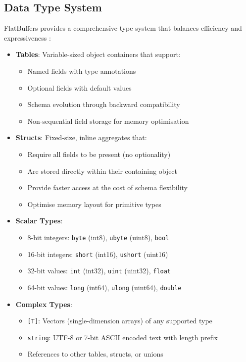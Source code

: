 \subsection{Data Type System}
\label{tb:flatbuffers:data_type_system}

FlatBuffers provides a comprehensive type system that balances efficiency and expressiveness \citep{flatbuffers_data_types}:

\begin{itemize}
  \item \textbf{Tables}: Variable-sized object containers that support:
    \begin{itemize}
      \item Named fields with type annotations
      \item Optional fields with default values
      \item Schema evolution through backward compatibility
      \item Non-sequential field storage for memory optimisation
    \end{itemize}

  \item \textbf{Structs}: Fixed-size, inline aggregates that:
    \begin{itemize}
      \item Require all fields to be present (no optionality)
      \item Are stored directly within their containing object
      \item Provide faster access at the cost of schema flexibility
      \item Optimise memory layout for primitive types
    \end{itemize}

  \item \textbf{Scalar Types}:
    \begin{itemize}
      \item 8-bit integers: \texttt{byte} (int8), \texttt{ubyte} (uint8), \texttt{bool}
      \item 16-bit integers: \texttt{short} (int16), \texttt{ushort} (uint16)
      \item 32-bit values: \texttt{int} (int32), \texttt{uint} (uint32), \texttt{float}
      \item 64-bit values: \texttt{long} (int64), \texttt{ulong} (uint64), \texttt{double}
    \end{itemize}

  \item \textbf{Complex Types}:
    \begin{itemize}
      \item \texttt{[T]}: Vectors (single-dimension arrays) of any supported type
      \item \texttt{string}: UTF-8 or 7-bit ASCII encoded text with length prefix
      \item References to other tables, structs, or unions
    \end{itemize}


\end{itemize}
